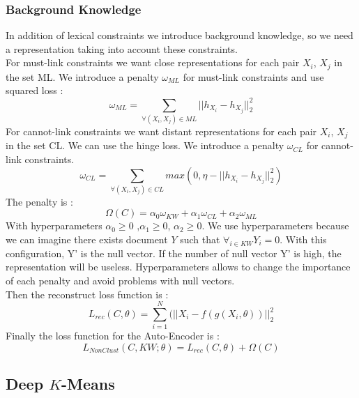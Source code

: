 \subsubsection{Background Knowledge}
In addition of lexical constraints we introduce background knowledge, so we need
a representation taking into account these constraints.\\
For must-link constraints we want close representations for each pair $X_i$, $X_j$
in the set ML. We introduce a penalty $\omega_{ML}$ for must-link
constraints and use squared loss :
\begin{equation}\label{eq:omegaML}
  \omega_{ML} = \sum_{\forall{(X_i,X_j)\in ML}} || h_{X_i} - h_{X_j} ||_2^2
\end{equation}
For cannot-link constraints we want distant representations for each pair $X_i$,
$X_j$ in the set CL.
We can use the hinge loss.
We introduce a penalty $\omega_{CL}$ for cannot-link constraints.
\begin{equation}\label{eq:omegaCL}
  \omega_{CL} = \sum_{\forall{(X_i,X_j)\in CL}} max(0,
  \eta - || h_{X_i} - h_{X_j} ||_2^2)
\end{equation}
The penalty is :
\begin{equation}\label{eq:Sparse}
  \Omega(C) = \alpha_0\omega_{KW} + \alpha_1\omega_{CL} + \alpha_2\omega_{ML}  
\end{equation}
With hyperparameters $\alpha_0\geq 0$ ,$\alpha_1\geq 0$, $\alpha_2\geq 0$. We use
hyperparameters because we can imagine there exists document $Y$ such that
$\forall_{i \in KW} Y_i = 0$. With this configuration, Y' is the null vector. If the
number of null vector Y' is high, the representation will be useless.
Hyperparameters allows to change the importance of each penalty
and avoid problems with null vectors.\\
Then the reconstruct loss function is :
\begin{equation}\label{eq:AEDK}
  L_{rec}(C, \theta) = \sum_{i=1}^N(||X_i - f(g(X_i, \theta))||_2^2
\end{equation}
Finally the loss function for the Auto-Encoder is :
\begin{equation}\label{eq:AE}
  L_{NonClust}(C,KW; \theta) = L_{rec}(C, \theta) + \Omega(C)  
\end{equation}

\subsection{Deep $K$-Means}

